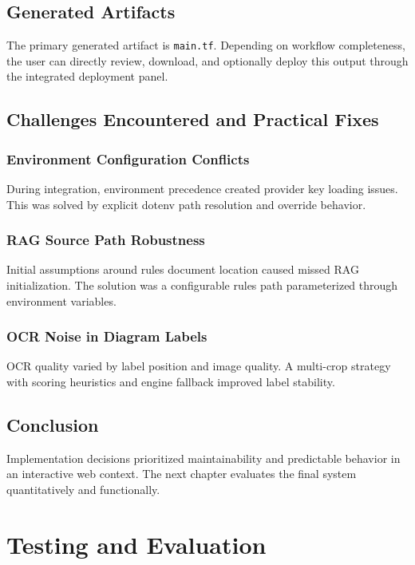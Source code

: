 \documentclass[12pt,a4paper,openany]{report}
\begin{document}
\section{Generated Artifacts}

The primary generated artifact is \texttt{main.tf}. Depending on workflow completeness, the user can directly review, download, and optionally deploy this output through the integrated deployment panel.

\section{Challenges Encountered and Practical Fixes}

\subsection{Environment Configuration Conflicts}

During integration, environment precedence created provider key loading issues. This was solved by explicit dotenv path resolution and override behavior.

\subsection{RAG Source Path Robustness}

Initial assumptions around rules document location caused missed RAG initialization. The solution was a configurable rules path parameterized through environment variables.

\subsection{OCR Noise in Diagram Labels}

OCR quality varied by label position and image quality. A multi-crop strategy with scoring heuristics and engine fallback improved label stability.

\section{Conclusion}

Implementation decisions prioritized maintainability and predictable behavior in an interactive web context. The next chapter evaluates the final system quantitatively and functionally.

\chapter{Testing and Evaluation}
\end{document}
